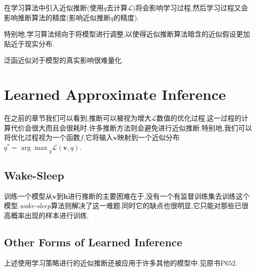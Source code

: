 在学习算法中引入近似推断(使用$q$去计算$\mathcal L$)将会影响学习过程,然后学习过程又会影响推断算法的精度(影响近似推断$q$的精度).

特别地,学习算法倾向于将模型进行调整,以使得近似推断算法暗含的近似假设更加贴近于现实分布.

泛函近似对于模型的真实影响很难量化.

\section{Learned Approximate Inference}

在之前的章节我们可以看到,推断可以被视为增大$\mathcal L$数值的优化过程.这一过程的计算代价会很大而且会很耗时.许多推断方法则会避免进行近似推断.特别地,我们可以将优化过程视为一个函数$f$,它将输入$\mathbf v$映射到一个近似分布$q^\ast={\arg\max}_q\mathcal L(\mathbf v,q)$.

\subsection{Wake-Sleep}

训练一个模型从$\mathbf v$到$\mathbf h$进行推断的主要困难在于,没有一个有监督训练集去训练这个模型.\textit{wake-sleep}算法则解决了这一难题.同时它的缺点也很明显,它只能对那些已很高概率出现的样本进行训练.

\subsection{Other Forms of Learned Inference}

上述使用学习策略进行的近似推断还被应用于许多其他的模型中.见原书P$652$.
